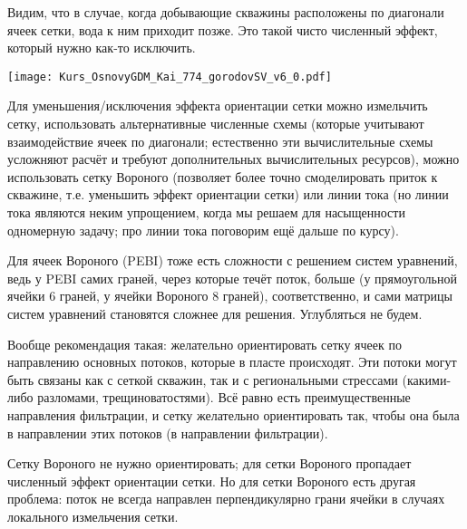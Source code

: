 Видим, что в случае, когда добывающие скважины расположены по диагонали ячеек сетки, вода к ним приходит позже.
Это такой чисто численный эффект, который нужно как-то исключить. 

\texttt{[image: Kurs\_OsnovyGDM\_Kai\_774\_gorodovSV\_v6\_0.pdf]}

Для уменьшения/исключения эффекта ориентации сетки можно измельчить сетку, использовать альтернативные численные схемы (которые учитывают взаимодействие ячеек по диагонали; естественно эти вычислительные схемы усложняют расчёт и требуют дополнительных вычислительных ресурсов), можно использовать сетку Вороного (позволяет более точно смоделировать приток к скважине, т.е. уменьшить эффект ориентации сетки) или линии тока (но линии тока являются неким упрощением, когда мы решаем для насыщенности одномерную задачу; про линии тока поговорим ещё дальше по курсу).

Для ячеек Вороного (PEBI) тоже есть сложности с решением систем уравнений, ведь у PEBI самих граней, через которые течёт поток, больше (у прямоугольной ячейки 6 граней, у ячейки Вороного 8 граней), соответственно, и сами матрицы систем уравнений становятся сложнее для решения.
Углубляться не будем.

Вообще рекомендация такая: желательно ориентировать сетку ячеек по направлению основных потоков, которые в пласте происходят.
Эти потоки могут быть связаны как с сеткой скважин, так и с региональными стрессами (какими-либо разломами, трещиноватостями). Всё равно есть преимущественные направления фильтрации, и сетку желательно ориентировать так, чтобы она была в направлении этих потоков (в направлении фильтрации).

Сетку Вороного не нужно ориентировать; для сетки Вороного пропадает численный эффект ориентации сетки.
Но для сетки Вороного есть другая проблема: поток не всегда направлен перпендикулярно грани ячейки в случаях локального измельчения сетки.


